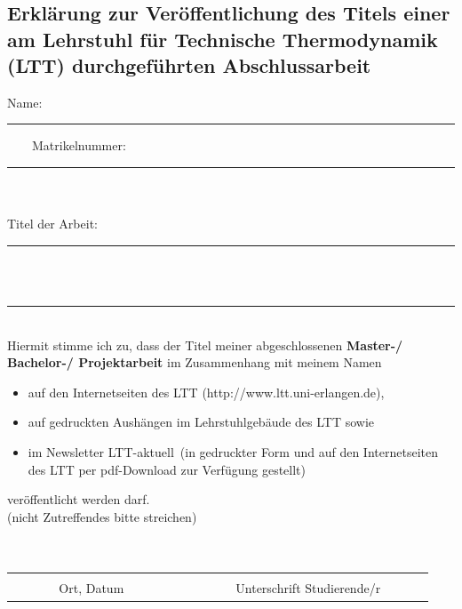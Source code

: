 \chapter*{}
\section*{Erklärung zur Veröffentlichung des Titels einer am Lehrstuhl für Technische Thermodynamik (LTT) durchgeführten Abschlussarbeit}\label{chapter:Erklaerung_Veroeffentlichung}


Name:\rule{0.45\textwidth}{0.5pt} $\qquad$Matrikelnummer:\rule{0.25\textwidth}{0.4pt}  \\
\\
Titel der Arbeit:\rule{0.825\textwidth}{0.4pt} \\
\\
\rule{\textwidth}{0.4pt} \\

Hiermit stimme ich zu, dass der Titel meiner abgeschlossenen \textbf{Master-/ Bachelor-/ Projektarbeit }im Zusammenhang mit meinem Namen
\begin{itemize}
 \item auf den Internetseiten des LTT (http://www.ltt.uni-erlangen.de),
 \item auf gedruckten Aushängen im Lehrstuhlgebäude des LTT sowie
 \item im Newsletter \glqq LTT-aktuell\grqq \, (in gedruckter Form und auf den Internetseiten des LTT per pdf-Download zur Verfügung gestellt) 
\end{itemize}
veröffentlicht werden darf.\\
(nicht Zutreffendes bitte streichen) \newline
\\
\\
\\

\begin{tabularx}{\textwidth}{lXc}
   &     &  \\ \hhline{-~-}
 $\quad$ $\qquad$ Ort, Datum $\qquad$$\quad$	 &     &$\quad$ $\qquad$ Unterschrift Studierende/r $\qquad$$\quad$
\end{tabularx} 	  						


